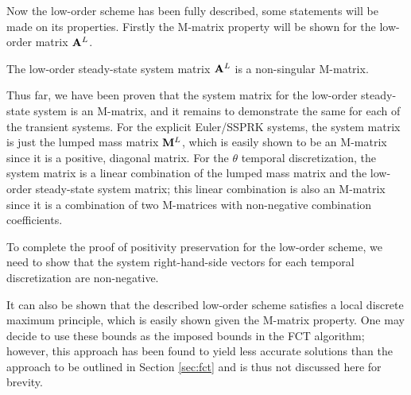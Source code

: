 Now the low-order scheme has been fully described, some statements will be
made on its properties. Firstly the M-matrix property will be shown for the low-order
matrix $\mathbf{A}^L$.
\begin{thm}
  The low-order steady-state system matrix $\mathbf{A}^L$ is a non-singular M-matrix.
\end{thm}

Thus far, we have been proven that the system matrix for the low-order steady-state
system is an M-matrix, and it remains to demonstrate the same for each of the
transient systems. For the explicit Euler/SSPRK systems, the system matrix
is just the lumped mass matrix $\mathbf{M}^L$, which is easily shown to be an M-matrix
since it is a positive, diagonal matrix. For the $\theta$ temporal
discretization, the system matrix is a linear combination of the lumped mass
matrix and the low-order steady-state system matrix; this linear combination
is also an M-matrix since it is a combination of two M-matrices with non-negative
combination coefficients.

To complete the proof of positivity preservation for the low-order scheme,
we need to show that
the system right-hand-side vectors for each temporal discretization are
non-negative.


It can also be shown that the described low-order scheme satisfies a local
discrete maximum principle, which is easily shown given the M-matrix property.
One may decide to use these bounds as the imposed bounds in the FCT
algorithm; however, this approach has been found to yield less accurate solutions
than the approach to be outlined in Section \ref{sec:fct} and is thus not discussed here
for brevity.
